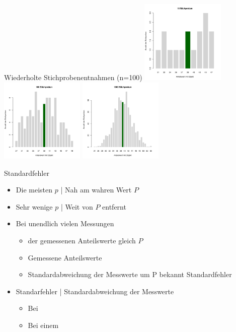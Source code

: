 \begin{frame}
  {Wiederholte Stichprobenentnahmen (n=100)}
  \centering 
  \includegraphics[width=0.3\textwidth]{RVorlesung/manybernoullis1}
  \includegraphics[width=0.3\textwidth]{RVorlesung/manybernoullis2}
  \includegraphics[width=0.3\textwidth]{RVorlesung/manybernoullis3}
\end{frame}


\begin{frame}
  {Standardfehler}
  \begin{itemize}[<+->]
    \item Die \alert{meisten $p$} | Nah am wahren Wert $P$
    \item Sehr \alert{wenige $p$} | Weit von $P$ entfernt
      \Halbzeile
    \item Bei unendlich vielen Messungen
      \begin{itemize}[<+->]
        \item \alert{ der gemessenen Anteilswerte gleich $P$}
        \item Gemessene Anteilswerte 
        \item \alert{Standardabweichung} der Messwerte um P bekannt  Standardfehler
      \end{itemize}
     \Zeile 
    \item \alert{Standarfehler} | Standardabweichung der Messwerte
      \begin{itemize}[<+->]
        \item Bei 
        \item Bei einem 
      \end{itemize}
  \end{itemize}
\end{frame}

